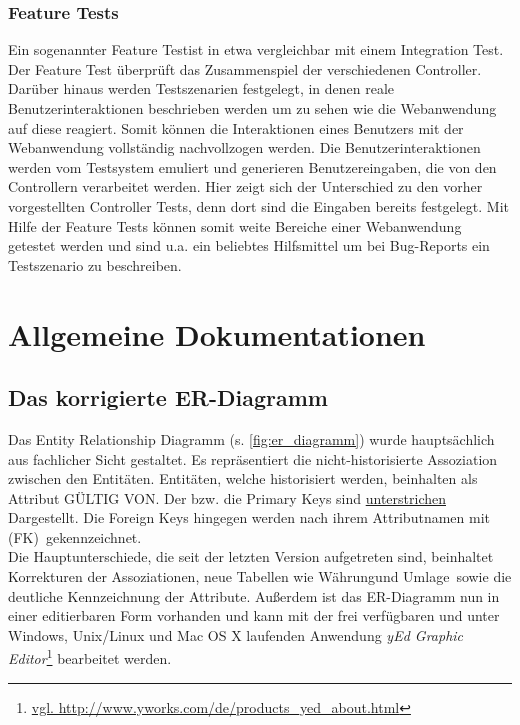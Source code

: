 \documentclass[12pt,             %
               a4paper,          %
               listof=totoc,     %
               index=totoc,      %
               bibliography=totoc,%
               oneside,         %
               BCOR1cm,          %
               english   %
               ]{scrbook}
\begin{document}
\subsection{Feature Tests}
Ein sogenannter \glqq Feature Test\grqq ist in etwa vergleichbar mit einem \glqq Integration Test\grqq. Der Feature Test überprüft das Zusammenspiel der verschiedenen Controller. Darüber hinaus werden Testszenarien festgelegt, in denen reale Benutzerinteraktionen beschrieben werden um zu sehen wie die Webanwendung auf diese reagiert. Somit können die Interaktionen eines Benutzers mit der Webanwendung vollständig nachvollzogen werden. Die Benutzerinteraktionen werden vom Testsystem emuliert und generieren Benutzereingaben, die von den Controllern verarbeitet werden. Hier zeigt sich der Unterschied zu den vorher vorgestellten Controller Tests, denn dort sind die Eingaben bereits festgelegt. Mit Hilfe der Feature Tests können somit weite Bereiche einer Webanwendung getestet werden und sind u.a. ein beliebtes Hilfsmittel um bei Bug-Reports ein Testszenario zu beschreiben.

\clearpage
\chapter{Allgemeine Dokumentationen}
\section{Das korrigierte ER-Diagramm}

Das Entity Relationship Diagramm (s. \vref{fig:er_diagramm}) wurde hauptsächlich aus fachlicher Sicht gestaltet. Es repräsentiert die nicht-historisierte Assoziation zwischen den Entitäten. Entitäten, welche historisiert werden, beinhalten als Attribut \glqq GÜLTIG VON\grqq. Der bzw. die Primary Keys sind \underline{unterstrichen} Dargestellt. Die Foreign Keys hingegen werden nach ihrem Attributnamen mit \glqq (FK)\grqq\ gekennzeichnet.\\
Die Hauptunterschiede, die seit der letzten Version aufgetreten sind, beinhaltet Korrekturen der Assoziationen, neue Tabellen wie \glqq Währung\grqq und \glqq Umlage\grqq\ sowie die deutliche Kennzeichnung der Attribute. Außerdem ist das ER-Diagramm nun in einer editierbaren Form vorhanden und kann mit der frei verfügbaren und unter Windows, Unix/Linux und Mac OS X laufenden Anwendung \textit{yEd Graphic Editor}\footnote{\url{vgl. http://www.yworks.com/de/products_yed_about.html}} bearbeitet werden. 
\end{document}
